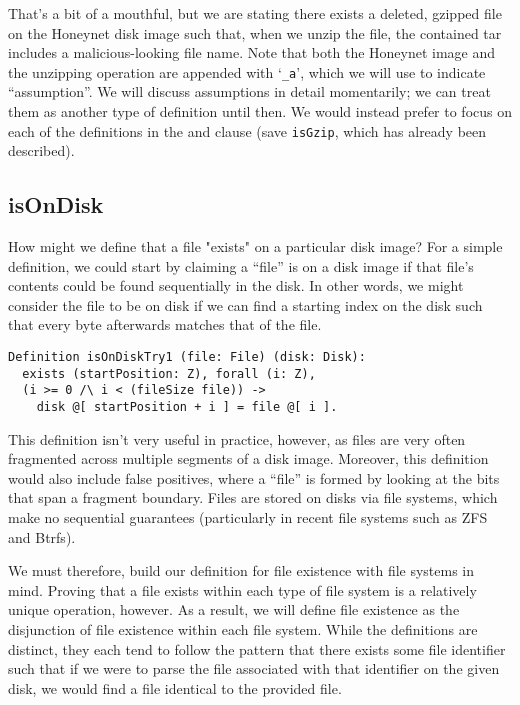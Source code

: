 \documentclass[nocopyrightspace]{sigplanconf}
\begin{document}
That's a bit of a mouthful, but we are stating there exists a deleted, gzipped
file on the Honeynet disk image such that, when we unzip the file, the
contained tar includes a malicious-looking file name. Note that both the
Honeynet image and the unzipping operation are appended with `{\tt \_a}',
which we will use to indicate ``assumption''. We will discuss assumptions in
detail momentarily; we can treat them as another type of definition until
then. We would instead prefer to focus on each of the definitions in the and
clause (save {\tt isGzip}, which has already been described).

\subsection{isOnDisk}

How might we define that a file "exists" on a particular disk image? For a
simple definition, we could start by claiming a ``file'' is on a disk image if
that file's contents could be found sequentially in the disk. In other words,
we might consider the file to be on disk if we can find a starting index on
the disk such that every byte afterwards matches that of the file.

\begin{lstlisting}
Definition isOnDiskTry1 (file: File) (disk: Disk):
  exists (startPosition: Z), forall (i: Z),
  (i >= 0 /\ i < (fileSize file)) -> 
    disk @[ startPosition + i ] = file @[ i ].
\end{lstlisting}

This definition isn't very useful in practice, however, as files are very
often fragmented across multiple segments of a disk image. Moreover, this
definition would also include false positives, where a ``file'' is formed by
looking at the bits that span a fragment boundary. Files are stored on disks
via file systems, which make no sequential guarantees (particularly in recent
file systems such as ZFS and Btrfs).

We must therefore, build our definition for file existence with file systems
in mind. Proving that a file exists within each type of file system is a
relatively unique operation, however. As a result, we will define file
existence as the disjunction of file existence within each file system. While
the definitions are distinct, they each tend to follow the pattern that there
exists some file identifier such that if we were to parse the file associated
with that identifier on the given disk, we would find a file identical to the
provided file.
\end{document}
